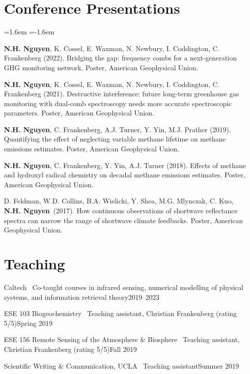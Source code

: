 \documentclass[11pt,letterpaper]{article}
\newcommand{\simpleentry}[2]{\noindent #1\hfill{#2}\par\vspace{1pt}}
\newcommand{\me}{\textbf{N.H. Nguyen}}
\newenvironment{pubs}
  {\begin{list}{}{\leftmargin=1.6em \itemindent=-1.6em
   \topsep=3pt \itemsep=4pt \parsep=0pt}}
  {\end{list}}
\let\oldsection\section
\renewcommand{\section}[1]{\Needspace*{5\baselineskip}\oldsection{#1}}
\begin{document}
\section{Conference Presentations}

\begin{pubs}
\item[] \me, K. Cossel, E. Waxman, N. Newbury, I. Coddington, C. Frankenberg (2022). Bridging the gap:
  frequency combs for a next-generation GHG monitoring network. Poster, American Geophysical Union.

\item[] \me, K. Cossel, E. Waxman, N. Newbury, I. Coddington, C. Frankenberg (2021). Destructive
  interference: future long-term greenhouse gas monitoring with dual-comb spectroscopy needs more
  accurate spectroscopic parameters. Poster, American Geophysical Union.

\item[] \me, C. Frankenberg, A.J. Turner, Y. Yin, M.J. Prather (2019). Quantifying the effect of neglecting
  variable methane lifetime on methane emissions estimates. Poster, American Geophysical Union.

\item[] \me, C. Frankenberg, Y. Yin, A.J. Turner (2018). Effects of methane and hydroxyl radical chemistry
  on decadal methane emissions estimates. Poster, American Geophysical Union.

\item[] D. Feldman, W.D. Collins, B.A. Wielicki, Y. Shea, M.G. Mlynczak, C. Kuo, \me\ (2017). How
  continuous observations of shortwave reflectance spectra can narrow the range of shortwave climate
  feedbacks. Poster, American Geophysical Union.
\end{pubs}

\section{Teaching}

\simpleentry{Caltech \textbar\ Co-taught courses in infrared sensing, numerical modelling of physical systems, and information retrieval theory}{2019--2023}
\simpleentry{ESE 103 Biogeochemistry \textbar\ Teaching assistant, Christian Frankenberg (rating 5/5)}{Spring 2019}
\simpleentry{ESE 156 Remote Sensing of the Atmosphere \& Biosphere \textbar\ Teaching assistant, Christian Frankenberg (rating 5/5)}{Fall 2019}
\simpleentry{Scientific Writing \& Communication, UCLA \textbar\ Teaching assistant}{Summer 2019}
\end{document}
